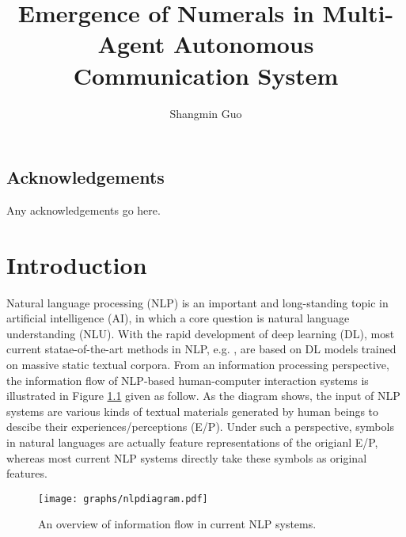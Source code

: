 \documentclass[msc,deptreport]{infthesis} %
\begin{document}
\begin{preliminary}

\title{Emergence of Numerals in Multi-Agent Autonomous Communication System}

\author{Shangmin Guo}


\maketitle

\section*{Acknowledgements}
Any acknowledgements go here. 

\tableofcontents
\end{preliminary}


\chapter{Introduction}
\label{ch1:intro}

Natural language processing (NLP) is an important and long-standing topic in artificial intelligence (AI), in which a core question is natural language understanding (NLU). With the rapid development of deep learning (DL), most current statae-of-the-art methods in NLP, e.g. \cite{socher2013recursive, word2vec2013, kim2014cnn}, are based on DL models trained on massive static textual corpora. From an information processing perspective, the information flow of NLP-based human-computer interaction systems is illustrated in Figure \ref{fig1:nlpdiagram} given as follow. As the diagram shows, the input of NLP systems are various kinds of textual materials generated by human beings to descibe their experiences/perceptions (E/P). Under such a perspective, symbols in natural languages are actually feature representations of the origianl E/P, whereas most current NLP systems directly take these symbols as original features.

\begin{figure}[!h]
  \centering
  \texttt{[image: graphs/nlpdiagram.pdf]}
  \caption{An overview of information flow in current NLP systems.}
  \label{fig1:nlpdiagram}
\end{figure}
\end{document}
